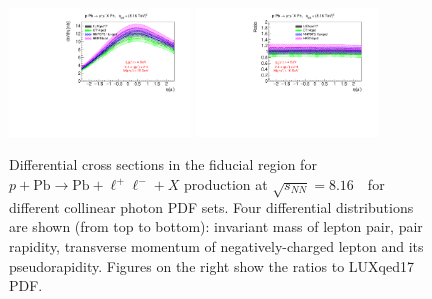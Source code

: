 \begin{figure}[h!]
\includegraphics[width=0.43\textwidth]{figures/etal_inc_cut.pdf}
\includegraphics[width=0.43\textwidth]{figures/Ratioetal_inc_cut.pdf}
\caption{Differential cross sections in the fiducial region for $p+\textrm{Pb}\rightarrow \textrm{Pb} + \ell^+\ell^- + X$ production at $\sqrt{s_{N N}} = 8.16$~\TeV\ for different collinear photon PDF sets.
Four differential distributions are shown (from top to bottom): invariant mass of lepton pair, pair rapidity, transverse momentum of negatively-charged lepton and its pseudorapidity. Figures on the right show the ratios to LUXqed17 PDF.}
\label{fig:inc_cut}
\end{figure}



